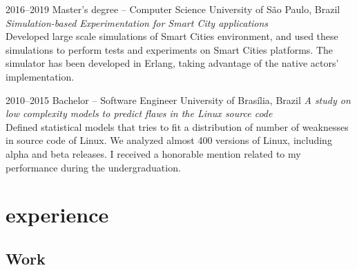 \documentclass[print]{friggeri-cv}
\begin{document}
\begin{entrylist}


\entry
{2016--2019}
{Master's degree -- {\normalfont Computer Science}}
{University of São Paulo, Brazil}
  {\emph{Simulation-based Experimentation for Smart City applications} \\ Developed large scale simulations of Smart Cities environment, and used these simulations to perform tests and experiments on Smart Cities platforms. The simulator has been developed in Erlang, taking advantage of the native actors' implementation.}


\entry
{2010--2015}
{Bachelor -- {\normalfont Software Engineer}}
{University of Brasília, Brazil}
  {\emph{A study on low complexity models to predict flaws in the Linux source code} \\ Defined statistical models that tries to fit a distribution of number of weaknesses in source code of Linux. We analyzed almost 400 versions of Linux, including alpha and beta releases. I received a honorable mention related to my performance during the undergraduation. }


\end{entrylist}


\section{experience}

\subsection{Work}
\end{document}
